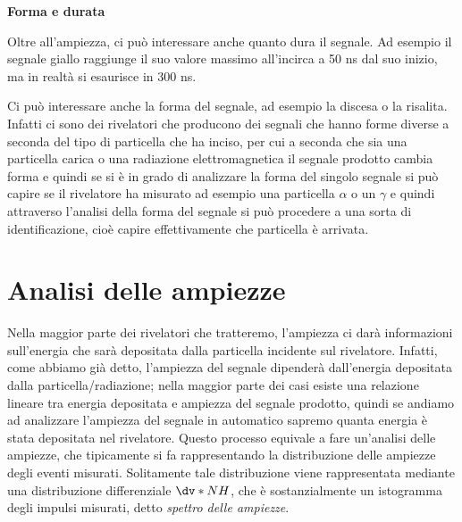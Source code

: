 \vspace{0.2cm}\textbf{Forma e durata}

Oltre all'ampiezza, ci può interessare anche quanto dura il segnale. Ad esempio il segnale giallo raggiunge il suo valore massimo all'incirca a 50 ns dal suo inizio, ma in realtà si esaurisce in 300 ns.

Ci può interessare anche la forma del segnale, ad esempio la discesa o la risalita. Infatti ci sono dei rivelatori che producono dei segnali che hanno forme diverse a seconda del tipo di particella che ha inciso, per cui a seconda che sia una particella carica o una radiazione elettromagnetica il segnale prodotto cambia forma e quindi se si è in grado di analizzare la forma del singolo segnale si può capire se il rivelatore ha misurato ad esempio una particella $\alpha$ o un $\gamma$ e quindi attraverso l'analisi della forma del segnale si può procedere a una sorta di identificazione, cioè capire effettivamente che particella è arrivata.

\section{Analisi delle ampiezze}

Nella maggior parte dei rivelatori che tratteremo, l'ampiezza ci darà informazioni sull'energia che sarà depositata dalla particella incidente sul rivelatore. Infatti, come abbiamo già detto, l'ampiezza del segnale dipenderà dall'energia depositata dalla particella/radiazione; nella maggior parte dei casi esiste una relazione lineare tra energia depositata e ampiezza del segnale prodotto, quindi se andiamo ad analizzare l'ampiezza del segnale in automatico sapremo quanta energia è stata depositata nel rivelatore. Questo processo equivale a fare un'analisi delle ampiezze, che tipicamente si fa rappresentando la distribuzione delle ampiezze degli eventi misurati. Solitamente tale distribuzione viene rappresentata mediante una distribuzione differenziale $\dv*{N}{H}$, che è sostanzialmente un istogramma degli impulsi misurati, detto \textit{spettro delle ampiezze}.

